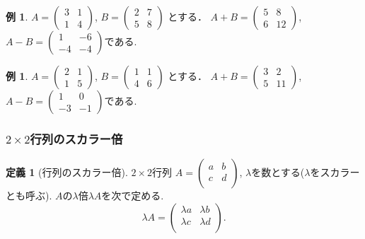 \documentclass[dvipdfmx,a4paper,11pt]{article}
\theoremstyle{definition}
\newtheorem{dfn}[thm]{定義}
\newtheorem{exa}[thm]{例}
\begin{document}
\begin{exa}
 $A = 
 \begin{pmatrix}
 3&1 \\
 1&4
 \end{pmatrix}
 $, 
 $
 B = 
 \begin{pmatrix}
 2&7\\
 5&8
 \end{pmatrix}
 $
 とする．
$
 A+B =
 \begin{pmatrix}
 5&8 \\
6&12
 \end{pmatrix}
 $, 
 $
  A-B =
 \begin{pmatrix}
 1&-6 \\
 -4&-4
 \end{pmatrix}
 $である.
 \end{exa}



\begin{exa}
 $A = 
 \begin{pmatrix}
 2&1 \\
 1&5
 \end{pmatrix}
 $, 
 $
 B = 
 \begin{pmatrix}
 1&1\\
 4&6
 \end{pmatrix}
 $
 とする．
$
 A+B =
 \begin{pmatrix}
 3&2 \\
5&11
 \end{pmatrix}
 $, 
 $
  A-B =
 \begin{pmatrix}
 1&0\\
 -3&-1
 \end{pmatrix}
 $である.
 \end{exa}
 
   \subsubsection{$2\times 2$行列のスカラー倍}
 
  \begin{tcolorbox}[
    colback = white,
    colframe = green!35!black,
    fonttitle = \bfseries,
    breakable = true]
    \begin{dfn}[行列のスカラー倍]
    \text{}
    
$2 \times 2$行列
$
A=\begin{pmatrix}
a& b \\
c& d \\
\end{pmatrix}
$, $\lambda$を数とする($\lambda$をスカラーとも呼ぶ).
$A$の$\lambda$倍$\lambda A$を次で定める.
$$
\lambda A=
\begin{pmatrix}
\lambda a&\lambda b \\
\lambda c&\lambda d \\
\end{pmatrix}.
$$
  \end{dfn}
 \end{tcolorbox}
\end{document}

